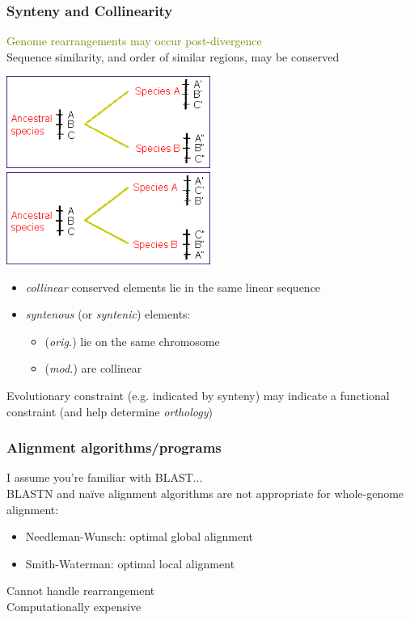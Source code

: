 %
\begin{frame}
  \frametitle{Synteny and Collinearity}
  \textcolor{olive}{Genome rearrangements may occur post-divergence} \\
  Sequence similarity, and order of similar regions, may be conserved
  \begin{center}
    \includegraphics[width=0.5\textwidth]{images/collinear}    
    \includegraphics[width=0.5\textwidth]{images/synteny}
  \end{center}    
  \begin{itemize}
    \item \textcolor{hutton_blue}{\textit{collinear}} conserved elements lie in the same linear sequence
    \item \textcolor{hutton_purple}{\textit{syntenous} (or \textit{syntenic})} elements:
    \begin{itemize}
      \item (\textit{orig.}) lie on the same chromosome
      \item (\textit{mod.}) are collinear
    \end{itemize}
  \end{itemize}
  Evolutionary constraint (e.g. indicated by synteny) may indicate a functional constraint (and help determine \textit{orthology})
\end{frame}

%
\begin{frame}
  \frametitle{Alignment algorithms/programs}
  \textcolor{hutton_green}{I assume you're familiar with BLAST$\ldots$} \\
  \textcolor{RawSienna}{BLASTN and na\"{i}ve alignment algorithms are not appropriate for whole-genome alignment}:
  \begin{itemize}
    \item Needleman-Wunsch: optimal global alignment
    \item Smith-Waterman: optimal local alignment
  \end{itemize}
  \textcolor{hutton_blue}{Cannot handle rearrangement} \\
  \textcolor{hutton_purple}{Computationally expensive}  
\end{frame}

